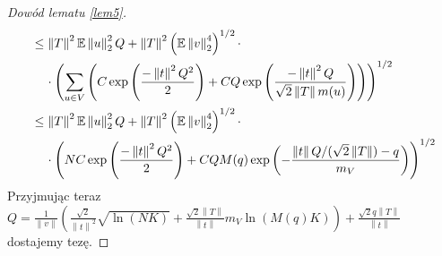 \documentclass[man,mfiu]{mgrwms}
\newcommand{\norm}[1]{\left\lVert#1\right\rVert}
\begin{document}
\begin{proof}[Dowód lematu \ref{lem5}]
\begin{displaymath}
\begin{split}
&\leq \norm{T}^2\mathbb{E}\norm{u}^2_2Q+\norm{T}^2\left(\mathbb{E}\norm{v}^4_2\right)^{1/2}\cdot\\
&\hspace{4mm}\cdot\left(\sum_{u\in V}\left(C \exp \left(\frac{-\norm{t}^2Q^2}{2}\right)+CQ\exp\left(\frac{-\norm{t}^2Q}{\sqrt{2}\norm{T}m(u)}\right)\right)\right)^{1/2}\\
&\leq \norm{T}^2\mathbb{E}\norm{u}^2_2Q+\norm{T}^2\left(\mathbb{E}\norm{v}^4_2\right)^{1/2}\cdot\\
&\hspace{4mm}\cdot\left(NC \exp \left(\frac{-\norm{t}^2Q^2}{2}\right)+CQM(q)\exp\left(-\frac{\norm{t}Q/(\sqrt{2}\norm{T})-q}{m_V}\right)\right)^{1/2}
\end{split}
\end{displaymath}
Przyjmując teraz $Q=\frac{1}{\norm{v}}\left(\frac{\sqrt{2}}{\norm{t}^2}\sqrt{\ln (NK)}+\frac{\sqrt{2}\norm{T}}{\norm{t}}m_V\ln(M(q)K)\right)+\frac{\sqrt{2}q\norm{T}}{\norm{t}}$ dostajemy tezę.
\end{proof}
\end{document}

